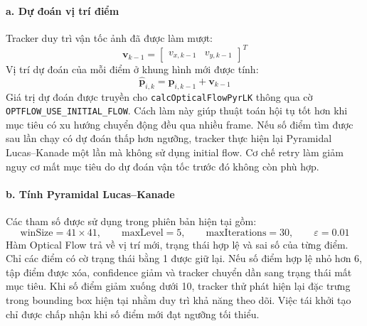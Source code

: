 \documentclass[../DoAn.tex]{subfiles}
\begin{document}
\paragraph{a. Dự đoán vị trí điểm}
Tracker duy trì vận tốc ảnh đã được làm mượt:
\[
\mathbf{v}_{k-1} = 
\begin{bmatrix}
v_{x,k-1} & v_{y,k-1}
\end{bmatrix}^{T}
\]
Vị trí dự đoán của mỗi điểm ở khung hình mới được tính:
\[
\widehat{\mathbf{p}}_{i,k} = \mathbf{p}_{i,k-1} + \mathbf{v}_{k-1}
\]
Giá trị dự đoán được truyền cho \texttt{calcOpticalFlowPyrLK} thông qua cờ \texttt{OPTFLOW\_USE\_INITIAL\_FLOW}. Cách làm này giúp thuật toán hội tụ tốt hơn khi mục tiêu có xu hướng chuyển động đều qua nhiều frame. Nếu số điểm tìm được sau lần chạy có dự đoán thấp hơn ngưỡng, tracker thực hiện lại Pyramidal Lucas--Kanade một lần mà không sử dụng initial flow. Cơ chế retry làm giảm nguy cơ mất mục tiêu do dự đoán vận tốc trước đó không còn phù hợp.

\paragraph{b. Tính Pyramidal Lucas--Kanade}
Các tham số được sử dụng trong phiên bản hiện tại gồm:
\[
\mathrm{winSize} = 41 \times 41, \qquad \mathrm{maxLevel} = 5, \qquad \mathrm{maxIterations} = 30, \qquad \varepsilon = 0.01
\]
Hàm Optical Flow trả về vị trí mới, trạng thái hợp lệ và sai số của từng điểm. Chỉ các điểm có cờ trạng thái bằng 1 được giữ lại. Nếu số điểm hợp lệ nhỏ hơn 6, tập điểm được xóa, confidence giảm và tracker chuyển dần sang trạng thái mất mục tiêu. Khi số điểm giảm xuống dưới 10, tracker thử phát hiện lại đặc trưng trong bounding box hiện tại nhằm duy trì khả năng theo dõi. Việc tái khởi tạo chỉ được chấp nhận khi số điểm mới đạt ngưỡng tối thiểu.
\end{document}
